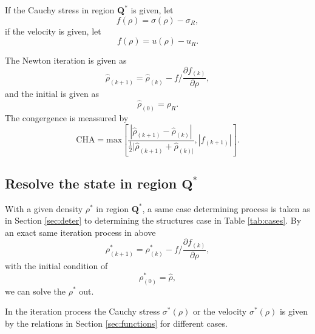 \documentclass[review]{elsarticle}
\begin{document}
\begin{enumerate}[Step 1]
If the Cauchy stress  in region $\mathbf{Q}^*$ is given, let
\begin{equation}
  f(\rho) = \sigma(\rho) -\sigma_R,
\end{equation}
if the velocity is given, let
\begin{equation}
  f(\rho) = u(\rho) -u_R.
\end{equation}

The  Newton iteration is given as
\begin{equation}
  \hat{\rho}_{(k+1)} = \hat{\rho}_{(k)}- f/\frac{\partial f_{(k)}}{\partial \rho},
\end{equation}
and the initial is given as 
\begin{equation}
  \hat{\rho}_{(0)} = \rho_R.
\end{equation}
The  congergence is meassured by
\begin{equation}
  \text{CHA} = \text{max} \left[\frac{|\hat{\rho}_{(k+1)}-\hat{\rho}_{(k)}|}{\frac{1}{2}|\hat{\rho}_{(k+1)}+\hat{\rho}_{(k)|}},|f_{(k+1)}|\right].
\end{equation}
\subsection{Resolve the state in region $\mathbf{Q}^*$}
With a given density $\rho^*$ in region $\mathbf{Q}^*$, a same case determining process is taken as in Section \ref{sec:deter} to determining the structures case in Table \ref{tab:cases}.  By  an exact same iteration process in above   
\begin{equation}
 \rho^*_{(k+1)} = \rho^*_{(k)}- f/\frac{\partial f_{(k)}}{\partial \rho},
\end{equation}
with the initial condition of 
\begin{equation}
  \rho^*_{(0)} = \hat{\rho},
\end{equation}
we can solve the $\rho^*$ out. 

In the iteration process the Cauchy stress $\sigma^*(\rho)$ or the velocity $\sigma^*(\rho)$ is given by the relations in Section \ref{sec:functions} for different cases.

\end{enumerate}
\end{document}

